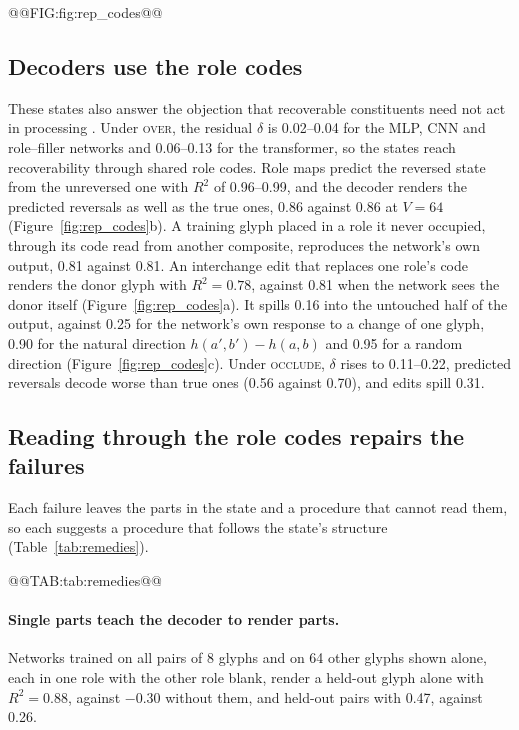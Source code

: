 @@FIG:fig:rep_codes@@

\subsection{Decoders use the role codes}
\label{sec:structure}

These states also answer the objection that recoverable constituents need not act in processing \citep{fodor1990}. Under \textsc{over}, the residual $\delta$ is 0.02--0.04 for the MLP, CNN and role--filler networks and 0.06--0.13 for the transformer, so the states reach recoverability through shared role codes. Role maps predict the reversed state from the unreversed one with $R^2$ of 0.96--0.99, and the decoder renders the predicted reversals as well as the true ones, 0.86 against 0.86 at $V = 64$ (Figure~\ref{fig:rep_codes}b). A training glyph placed in a role it never occupied, through its code read from another composite, reproduces the network's own output, 0.81 against 0.81. An interchange edit that replaces one role's code renders the donor glyph with $R^2 = 0.78$, against 0.81 when the network sees the donor itself (Figure~\ref{fig:rep_codes}a). It spills 0.16 into the untouched half of the output, against 0.25 for the network's own response to a change of one glyph, 0.90 for the natural direction $h(a', b') - h(a, b)$ and 0.95 for a random direction (Figure~\ref{fig:rep_codes}c). Under \textsc{occlude}, $\delta$ rises to 0.11--0.22, predicted reversals decode worse than true ones (0.56 against 0.70), and edits spill 0.31.

\subsection{Reading through the role codes repairs the failures}
\label{sec:remedies}

Each failure leaves the parts in the state and a procedure that cannot read them, so each suggests a procedure that follows the state's structure (Table~\ref{tab:remedies}).

@@TAB:tab:remedies@@

\paragraph{Single parts teach the decoder to render parts.} Networks trained on all pairs of 8 glyphs and on 64 other glyphs shown alone, each in one role with the other role blank, render a held-out glyph alone with $R^2 = 0.88$, against $-0.30$ without them, and held-out pairs with 0.47, against 0.26.


